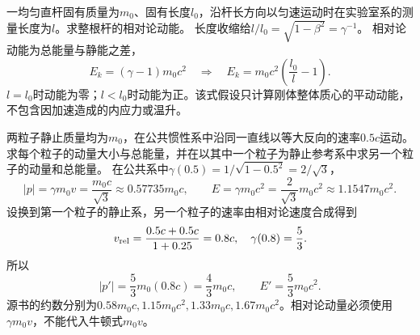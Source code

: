 \problemtext 一均匀直杆固有质量为$m_0$、固有长度$l_0$，沿杆长方向以匀速运动时在实验室系的测量长度为$l$。求整根杆的相对论动能。
\workings
长度收缩给$l/l_0=\sqrt{1-\beta^2}=\gamma^{-1}$。
相对论动能为总能量与静能之差，
\[
E_k=(\gamma-1)m_0c^2
\quad\Longrightarrow\quad
\boxed{E_k=m_0c^2\left(\frac{l_0}{l}-1\right)}.
\]
\crosscheck $l=l_0$时动能为零；$l<l_0$时动能为正。该式假设只计算刚体整体质心的平动动能，不包含因加速造成的内应力或温升。

\problemtext 两粒子静止质量均为$m_0$，在公共惯性系中沿同一直线以等大反向的速率$0.5c$运动。求每个粒子的动量大小与总能量，并在以其中一个粒子为静止参考系中求另一个粒子的动量和总能量。
\workings
在公共系中$\gamma(0.5)=1/\sqrt{1-0.5^2}=2/\sqrt3$，
\[
\boxed{|p|=\gamma m_0v=\frac{m_0c}{\sqrt3}\approx0.57735m_0c},
\qquad
\boxed{E=\gamma m_0c^2=\frac2{\sqrt3}m_0c^2\approx1.1547m_0c^2}.
\]
设换到第一个粒子的静止系，另一个粒子的速率由相对论速度合成得到
\[
v_{\rm rel}=\frac{0.5c+0.5c}{1+0.25}=0.8c,
\quad
\gamma(0.8)=\frac53.
\]
所以
\[
\boxed{|p'|=\frac53m_0(0.8c)=\frac43m_0c},
\qquad
\boxed{E'=\frac53m_0c^2}.
\]
\crosscheck 源书的约数分别为$0.58m_0c,1.15m_0c^2,1.33m_0c,1.67m_0c^2$。相对论动量必须使用$\gamma m_0v$，不能代入牛顿式$m_0v$。
